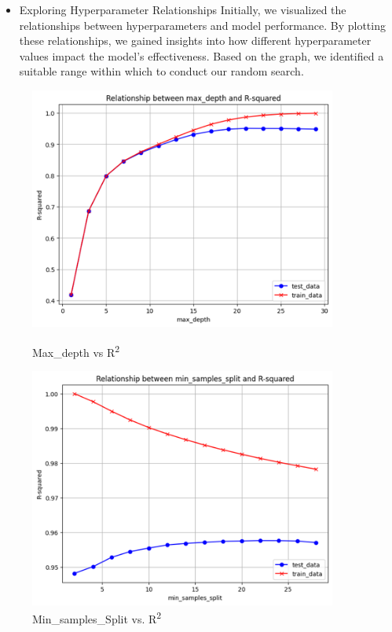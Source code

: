 \documentclass[12pt]{report}
\begin{document}
\begin{itemize}
    \item Exploring Hyperparameter Relationships
Initially, we visualized the relationships between hyperparameters and model performance. By plotting these relationships, we gained insights into how different hyperparameter values impact the model's effectiveness. Based on the graph, we identified a suitable range within which to conduct our random search.

\end{itemize}


\begin{figure}[h] %
    \centering

    \begin{minipage}{0.48\textwidth}
        \centering
        \includegraphics[width=0.9\textwidth]{unnamed.png}
        \caption{Max\_depth vs R\textsuperscript{2}}
        \label{pic1} %
    \end{minipage}\hfill
    \begin{minipage}{0.48\textwidth}
        \centering
        \includegraphics[width=0.9\textwidth]{unnamed-2.png}
        \caption{Min\_samples\_Split vs. R\textsuperscript{2}}
        \label{pic2} %
    \end{minipage}


\end{figure}
\end{document}
